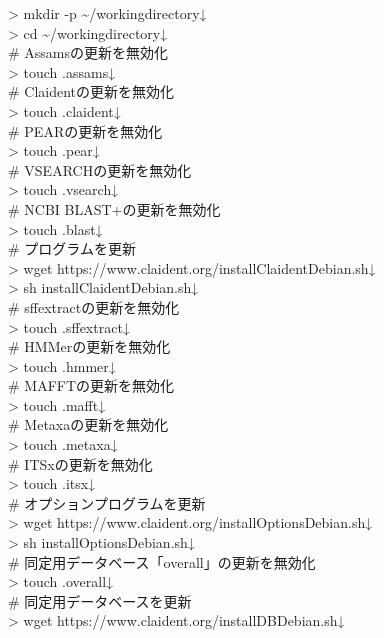\documentclass[titlepage,10pt,a4paper]{jsbook}
\newenvironment{cmd}{\begin{oframed}\raggedright\ttfamily\footnotesize\setlength{\baselineskip}{1.4em}}{\end{oframed}\vspace{-1em}}
\begin{document}
\begin{cmd}
{\textgreater} mkdir -p {\textasciitilde}/workingdirectory↓\\
{\textgreater} cd {\textasciitilde}/workingdirectory↓\\
\# Assamsの更新を無効化\\
{\textgreater} touch .assams↓\\
\# Claidentの更新を無効化\\
{\textgreater} touch .claident↓\\
\# PEARの更新を無効化\\
{\textgreater} touch .pear↓\\
\# VSEARCHの更新を無効化\\
{\textgreater} touch .vsearch↓\\
\# NCBI BLAST+の更新を無効化\\
{\textgreater} touch .blast↓\\
\# プログラムを更新\\
{\textgreater} wget https://www.claident.org/installClaident{\textunderscore}Debian.sh↓\\
{\textgreater} sh installClaident{\textunderscore}Debian.sh↓\\
\# sff{\textunderscore}extractの更新を無効化\\
{\textgreater} touch .sffextract↓\\
\# HMMerの更新を無効化\\
{\textgreater} touch .hmmer↓\\
\# MAFFTの更新を無効化\\
{\textgreater} touch .mafft↓\\
\# Metaxaの更新を無効化\\
{\textgreater} touch .metaxa↓\\
\# ITSxの更新を無効化\\
{\textgreater} touch .itsx↓\\
\# オプションプログラムを更新\\
{\textgreater} wget https://www.claident.org/installOptions{\textunderscore}Debian.sh↓\\
{\textgreater} sh installOptions{\textunderscore}Debian.sh↓\\
\# 同定用データベース「overall」の更新を無効化\\
{\textgreater} touch .overall↓\\
\# 同定用データベースを更新\\
{\textgreater} wget https://www.claident.org/installDB{\textunderscore}Debian.sh↓\\

\end{cmd}
\end{document}
